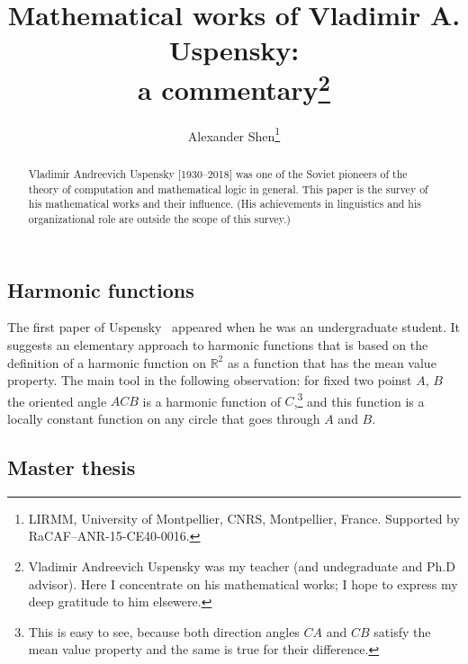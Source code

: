 \documentclass[12pt]{article}
\theoremstyle{remark}
\begin{document}
\title{Mathematical works of Vladimir A. Uspensky:\\ a commentary\footnote{Vladimir Andreevich Uspensky was my teacher (and undegraduate and Ph.D advisor). Here I concentrate on his mathematical works; I hope to express my deep gratitude to him elsewere.}}
\author{Alexander Shen\footnote{LIRMM, University of Montpellier, CNRS, Montpellier, France. Supported by RaCAF--ANR-15-CE40-0016.}}
\date{}
\maketitle

\begin{abstract}
Vladimir Andreevich Uspensky [1930--2018] was one of the Soviet pioneers of the theory of computation and mathematical logic in general. This paper is the survey of his mathematical works and their influence. (His achievements in linguistics and his organizational role are outside the scope of this survey.) 

\end{abstract}

\subsection*{Harmonic functions}

The first paper of Uspensky~\cite{1949} appeared when he was an undergraduate student. It suggests an elementary approach to harmonic functions that is based on the definition of a harmonic function on $\mathbb{R}^2$ as a function that has the mean value property. The main tool in the following observation: for fixed two poinst $A$, $B$ the oriented angle $ACB$ is a harmonic function of $C$,\footnote{This is easy to see, because both direction angles $CA$ and $CB$ satisfy the mean value property and the same is true for their difference.} and this function is a locally constant function on any circle that goes through $A$ and $B$.

\medskip

\subsection*{Master thesis}
\end{document}
